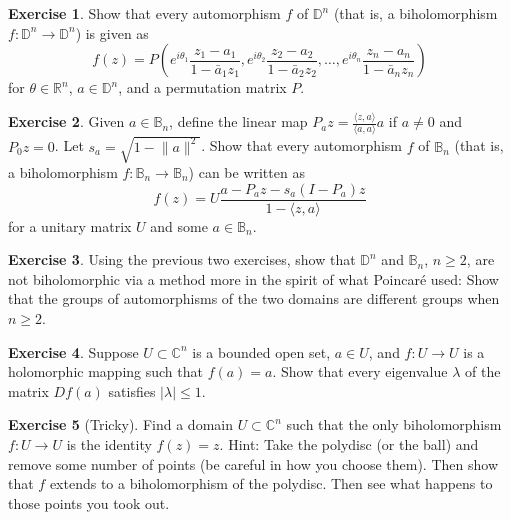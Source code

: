 \documentclass[12pt,openany]{book}
\newcommand{\linnprod}[2]{\langle #1 , #2 \rangle}
\newcommand{\sabs}[1]{\lvert {#1} \rvert}
\newcommand{\snorm}[1]{\lVert {#1} \rVert}
\newcommand{\C}{{\mathbb{C}}}
\newcommand{\R}{{\mathbb{R}}}
\newcommand{\D}{{\mathbb{D}}}
\newcommand{\bB}{{\mathbb{B}}}
\theoremstyle{plain}
\theoremstyle{remark}
\theoremstyle{definition}
\newenvironment{exbox}{%
    \def\FrameCommand{\vrule width 1pt \relax\hspace{10pt}}%
    \MakeFramed {\advance \hsize -\width \FrameRestore}%
}{%
    \endMakeFramed
}
\theoremstyle{exercise}
\newtheorem{exercise}{Exercise}[section]
\theoremstyle{example}
\begin{document}
\begin{exbox}
\begin{exercise}
Show that every automorphism $f$ of $\D^n$ (that is, a biholomorphism $f \colon \D^n \to \D^n$)
is given as
\begin{equation*}
f(z) = P \left(
e^{i\theta_1} \frac{z_1-a_1}{1-\bar{a}_1z_1} ,
e^{i\theta_2} \frac{z_2-a_2}{1-\bar{a}_2z_2} , \ldots,
e^{i\theta_n} \frac{z_n-a_n}{1-\bar{a}_nz_n} \right)
\end{equation*}
for $\theta \in \R^n$, $a \in \D^n$, and
a permutation matrix $P$.
\end{exercise}

\begin{exercise}
Given $a \in \bB_n$, define the linear map $P_a z =
\frac{\linnprod{z}{a}}{\linnprod{a}{a}}a$ if $a \not= 0$ and $P_0z = 0$.
Let $s_a = \sqrt{1-\snorm{a}^2}$.  Show that every automorphism $f$ of
$\bB_n$ (that is, a biholomorphism $f \colon \bB_n \to \bB_n$)
can be written as
\begin{equation*}
f(z) = U \frac{a-P_az-s_a(I-P_a)z}{1-\linnprod{z}{a}}
\end{equation*}
for a unitary matrix $U$ and some $a \in \bB_n$.
\end{exercise}

\begin{exercise}
Using the previous two exercises, show that $\D^n$ and $\bB_n$, $n \geq 2$,
are not biholomorphic via a method more in the spirit of what Poincar\'e
used: Show that the groups of automorphisms of the two domains are
different groups when $n \geq 2$.
\end{exercise}

\begin{exercise} \label{exercise:boundedeigen}
Suppose $U \subset \C^n$ is a bounded open set, $a \in U$, and $f \colon U \to U$ is a
holomorphic mapping such that $f(a) = a$.  Show that every eigenvalue
$\lambda$ of the matrix $Df(a)$ satisfies $\sabs{\lambda} \leq 1$.
\end{exercise}

\begin{exercise}[Tricky]
Find a domain $U \subset \C^n$ such that the only biholomorphism $f \colon U
\to U$ is the identity $f(z) = z$.  Hint: Take the polydisc (or the ball)
and remove some number of points (be careful in how you choose them).  Then
show that $f$ extends to a biholomorphism of the polydisc.  Then see what
happens to those points you took out.
\end{exercise}


\end{exbox}
\end{document}
